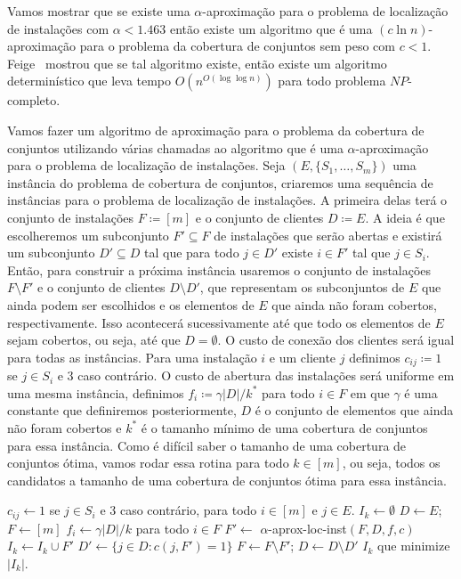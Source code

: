 Vamos mostrar que se existe uma $\alpha$-aproximação para o problema de localização de instalações com $\alpha < 1.463$ então existe um algoritmo que é uma $(c \ln n)$-aproximação para o problema da cobertura de conjuntos sem peso com $c<1$. 
Feige~\cite{Feige98} mostrou que se tal algoritmo existe, então existe um algoritmo determinístico que leva tempo $O(n^{O(\log\log n)})$ para todo problema $NP$-completo.

Vamos fazer um algoritmo de aproximação para o problema da cobertura de conjuntos utilizando várias chamadas ao algoritmo que é uma $\alpha$-aproximação para o problema de localização de instalações. 
Seja $(E,\{S_1,\ldots,S_m\})$ uma instância do problema de cobertura de conjuntos, criaremos uma sequência de instâncias para o problema de localização de instalações. 
A primeira delas terá o conjunto de instalações $F \coloneqq [m]$ e o conjunto de clientes $D \coloneqq E$. 
A ideia é que escolheremos um subconjunto $F' \subseteq F$ de instalações que serão abertas e existirá um subconjunto $D' \subseteq D$ tal que para todo $j \in D'$ existe $i \in F'$ tal que $j \in S_i$. 
Então, para construir a próxima instância usaremos o conjunto de instalações $F \setminus F'$ e o conjunto de clientes $D \setminus D'$, que representam os subconjuntos de $E$ que ainda podem ser escolhidos e os elementos de $E$ que ainda não foram cobertos, respectivamente. 
Isso acontecerá sucessivamente até que todo os elementos de $E$ sejam cobertos, ou seja, até que $D = \emptyset$.
O custo de conexão dos clientes será igual para todas as instâncias. Para uma instalação $i$ e um cliente $j$ definimos $c_{ij}\coloneqq 1$ se $j \in S_i$ e $3$ caso contrário.
O custo de abertura das instalações será uniforme em uma mesma instância, definimos $f_i \coloneqq \gamma |D|/k^*$ para todo $i\in F$ em que $\gamma$ é uma constante que definiremos posteriormente, $D$ é o conjunto de elementos que ainda não foram cobertos e $k^*$ é o tamanho mínimo de uma cobertura de conjuntos para essa instância. Como é difícil saber o tamanho de uma cobertura de conjuntos ótima, vamos rodar essa rotina para todo $k \in [m]$, ou seja, todos os candidatos a tamanho de uma cobertura de conjuntos ótima para essa instância.

\begin{algorithm}
    \caption{}
    \begin{algorithmic}[1]
        \State $c_{ij} \gets 1$ se $j \in S_i$ e 3 caso contrário, para todo $i \in [m]$ e $j \in E$.
            \State $I_k \gets \emptyset$
            \State $D \gets E$; $F \gets [m]$
                \State $f_i \gets \gamma |D|/k$ para todo $i \in F$
                \State $F' \gets$ {\sc $\alpha$-aprox-loc-inst}$(F,D,f,c)$
                \State $I_k \gets I_k \cup F'$
                \State $D' \gets \{j \in D: c(j,F') = 1 \}$
                \State $F \gets F \setminus F'$; $D\gets D\setminus D'$
            \EndWhile
        \EndFor
    \State \Return $I_k$ que minimize $|I_k|$.
    \end{algorithmic}
\end{algorithm}



